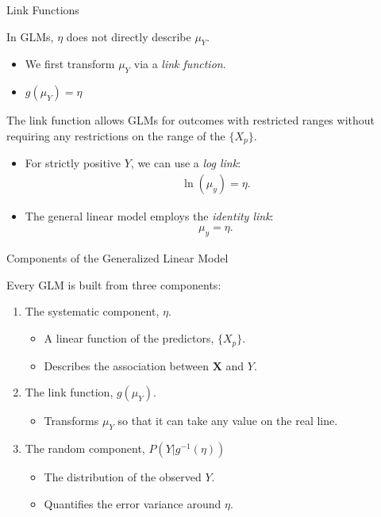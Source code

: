 \documentclass{beamer}\usepackage[]{graphicx}\usepackage[]{color}
\begin{document}
\begin{frame}{Link Functions}
  
  In GLMs, $\eta$ does not directly describe $\mu_Y$.
  \vc
  \begin{itemize}
  \item We first transform $\mu_Y$ via a \emph{link function}.
    \vc
  \item $g(\mu_Y) = \eta$
  \end{itemize}
  \vb
  The link function allows GLMs for outcomes with restricted ranges without 
  requiring any restrictions on the range of the $\{X_p\}$.
  \vb
  \begin{itemize}
  \item For strictly positive $Y$, we can use a \emph{log link}: 
    \begin{align*}
      \ln(\mu_y) = \eta.
    \end{align*}
  \item The general linear model employs the \emph{identity link}: 
    \begin{align*}
      \mu_y = \eta.
    \end{align*}
  \end{itemize}
  
\end{frame}


\begin{frame}{Components of the Generalized Linear Model}
  
  Every GLM is built from three components:
  \va
  \begin{enumerate}
  \item The systematic component, $\eta$.
    \vc
    \begin{itemize}
    \item A linear function of the predictors, $\{X_p\}$.
      \vc
    \item Describes the association between $\mathbf{X}$ and $Y$.
    \end{itemize}
    \va
  \item The link function, $g(\mu_Y)$.
    \vc
    \begin{itemize}
    \item Transforms $\mu_Y$ so that it can take any value on the real line.
    \end{itemize}
    \va
  \item The random component, $P(Y|g^{-1}(\eta))$
    \vc
    \begin{itemize}
    \item The distribution of the observed $Y$.
      \vc
    \item Quantifies the error variance around $\eta$.
    \end{itemize}
  \end{enumerate}
  
\end{frame}
\end{document}
